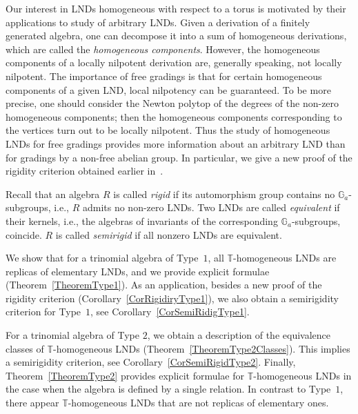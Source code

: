 \documentclass[a4paper,reqno,12pt]{amsart}
\theoremstyle{plain}
\theoremstyle{definition}
\theoremstyle{plain}
\theoremstyle{remark}
\newcommand{\TT}{\mathbb{T}}
\newcommand{\kk}{\Bbbk}
\begin{document}
Our interest in LNDs homogeneous with respect to a torus is motivated by their applications to study of arbitrary LNDs. Given a derivation of a finitely generated algebra, one can decompose it into a sum of homogeneous derivations, which are called the {\it homogeneous components}. However, the homogeneous components of a locally nilpotent derivation are, generally speaking, not locally nilpotent. The importance of free gradings is that for certain homogeneous components of a given LND, local nilpotency can be guaranteed. To be more precise, one should consider the Newton polytop of the degrees of the non-zero homogeneous components; then the homogeneous components corresponding to the vertices turn out to be locally nilpotent. Thus the study of homogeneous LNDs for free gradings provides more information about an arbitrary LND than for gradings by a non-free abelian group. %
In particular, we give a new proof of the rigidity criterion obtained earlier in~\cite{G}.

Recall that an algebra $R$ is called \textit{rigid} if its automorphism group contains no $\mathbb G_a$-subgroups, i.e., $R$ admits no non-zero LNDs. Two LNDs are called \textit{equivalent} if their kernels, i.e., the algebras of invariants of the corresponding $\mathbb G_a$-subgroups, coincide. $R$ is called \emph{semirigid} if all nonzero LNDs are equivalent.

We show that for a trinomial algebra of Type~$1$, all ${\TT}$-homogeneous LNDs are replicas of elementary LNDs, and we provide explicit formulae (Theorem~\ref{TheoremType1}). %
As an application, besides a new proof of the rigidity criterion (Corollary~\ref{CorRigidiryType1}), we also obtain a semirigidity criterion for Type~$1$, see Corollary~\ref{CorSemiRidigType1}.

For a trinomial algebra of Type $2$, we obtain a description of the equivalence classes of ${\TT}$-homogeneous LNDs (Theorem~\ref{TheoremType2Classes}). This implies a semirigidity criterion, see Corollary~\ref{CorSemiRigidType2}. Finally, Theorem~\ref{TheoremType2} provides explicit formulae for ${\TT}$-homogeneous LNDs in the case when the algebra is defined by a single relation. In contrast to Type~$1$, there appear ${\TT}$-homogeneous LNDs that are not replicas of elementary ones.
\end{document}
